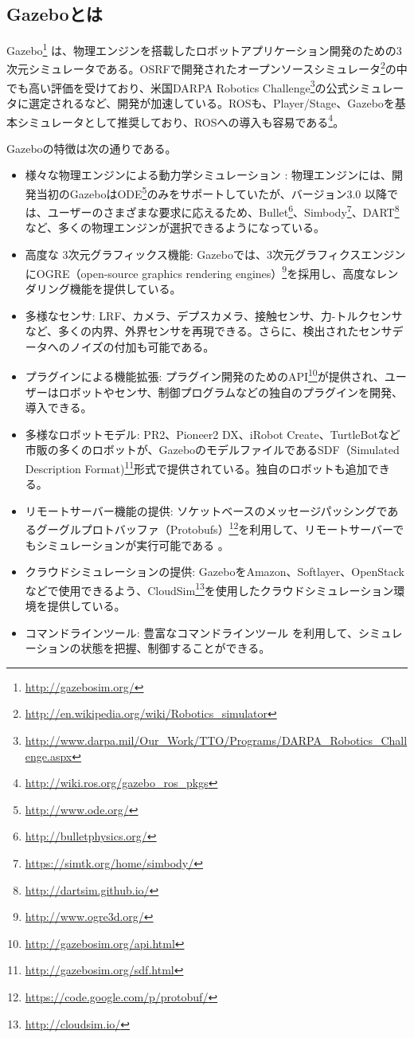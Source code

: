\begin{itemize}
\subsection{Gazeboとは}

Gazebo\footnote{\url{http://gazebosim.org/}} は、物理エンジンを搭載したロボットアプリケーション開発のための3次元シミュレータである。OSRFで開発されたオープンソースシミュレータ\footnote{\url{http://en.wikipedia.org/wiki/Robotics\_simulator}}の中でも高い評価を受けており、米国DARPA Robotics Challenge\footnote{\url{http://www.darpa.mil/Our\_Work/TTO/Programs/DARPA\_Robotics\_Challenge.aspx}}の公式シミュレータに選定されるなど、開発が加速している。ROSも、Player/Stage、Gazeboを基本シミュレータとして推奨しており、ROSへの導入も容易である\footnote{\url{http://wiki.ros.org/gazebo\_ros\_pkgs}}。

Gazeboの特徴は次の通りである。

\begin{itemize}
\item 様々な物理エンジンによる動力学シミュレーション  : 物理エンジンには、開発当初のGazeboはODE\footnote{\url{http://www.ode.org/}}のみをサポートしていたが、バージョン3.0  以降では、ユーザーのさまざまな要求に応えるため、Bullet\footnote{\url{http://bulletphysics.org/}}、Simbody\footnote{\url{https://simtk.org/home/simbody/}}、DART\footnote{\url{http://dartsim.github.io/}}など、多くの物理エンジンが選択できるようになっている。
\item 高度な 3次元グラフィックス機能: Gazeboでは、3次元グラフィクスエンジンにOGRE（open-source graphics rendering engines）\footnote{\url{http://www.ogre3d.org/}}を採用し、高度なレンダリング機能を提供している。
\item  多様なセンサ:  LRF、カメラ、デプスカメラ、接触センサ、力-トルクセンサなど、多くの内界、外界センサを再現できる。さらに、検出されたセンサデータへのノイズの付加も可能である。
\item  プラグインによる機能拡張: プラグイン開発のためのAPI\footnote{\url{http://gazebosim.org/api.html}}が提供され、ユーザーはロボットやセンサ、制御プログラムなどの独自のプラグインを開発、導入できる。
\item  多様なロボットモデル: PR2、Pioneer2 DX、iRobot Create、TurtleBotなど市販の多くのロボットが、GazeboのモデルファイルであるSDF（Simulated Description Format)\footnote{\url{http://gazebosim.org/sdf.html}}形式で提供されている。独自のロボットも追加できる。
\item  リモートサーバー機能の提供: ソケットベースのメッセージパッシングであるグーグルプロトバッファ（Protobufs）\footnote{\url{https://code.google.com/p/protobuf/}}を利用して、リモートサーバーでもシミュレーションが実行可能である  。
\item  クラウドシミュレーションの提供: GazeboをAmazon、Softlayer、OpenStackなどで使用できるよう、CloudSim\footnote{\url{http://cloudsim.io/}}を使用したクラウドシミュレーション環境を提供している。
\item コマンドラインツール: 豊富なコマンドラインツール  を利用して、シミュレーションの状態を把握、制御することができる。
\end{itemize}


\end{itemize}
